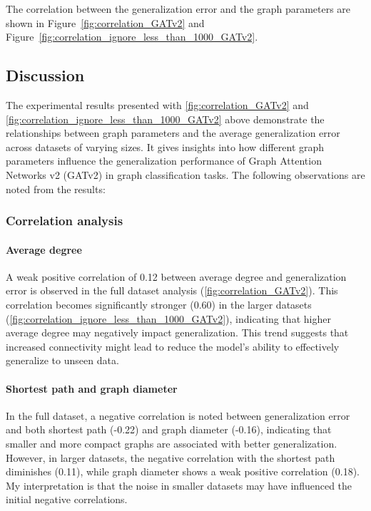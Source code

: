 The correlation between the generalization error and the graph parameters are shown in Figure~\ref{fig:correlation_GATv2} and Figure~\ref{fig:correlation_ignore_less_than_1000_GATv2}.


\subsection{Discussion}

The experimental results presented with \ref{fig:correlation_GATv2} and \ref{fig:correlation_ignore_less_than_1000_GATv2} above demonstrate the relationships between graph parameters and the average generalization error across datasets of varying sizes. It gives insights into how different graph parameters influence the generalization performance of Graph Attention Networks v2 (GATv2) in graph classification tasks. The following observations are noted from the results:

\subsubsection{Correlation analysis}

\paragraph{Average degree}
A weak positive correlation of 0.12 between average degree and generalization error is observed in the full dataset analysis (\ref{fig:correlation_GATv2}). This correlation becomes significantly stronger (0.60) in the larger datasets (\ref{fig:correlation_ignore_less_than_1000_GATv2}), indicating that higher average degree may negatively impact generalization. This trend suggests that increased connectivity might lead to reduce the model's ability to effectively generalize to unseen data.

\paragraph{Shortest path and graph diameter}
In the full dataset, a negative correlation is noted between generalization error and both shortest path (-0.22) and graph diameter (-0.16), indicating that smaller and more compact graphs are associated with better generalization. However, in larger datasets, the negative correlation with the shortest path diminishes (0.11), while graph diameter shows a weak positive correlation (0.18). My interpretation is that the noise in smaller datasets may have influenced the initial negative correlations.

